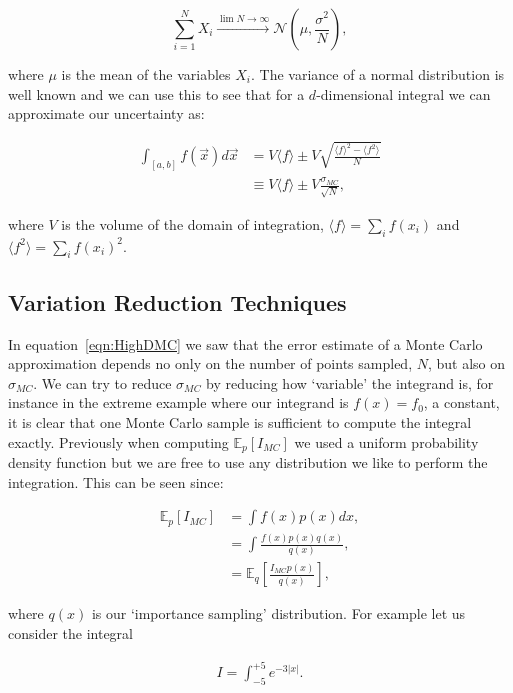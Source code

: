 	\begin{equation}
		\sum_{i=1}^{N}X_i\xrightarrow{\lim{N\rightarrow\infty}}\mathcal{N}\left(\mu, \frac{\sigma^2}{N}\right),
	\end{equation}

	where $\mu$ is the mean of the variables $X_i$.  The variance of a normal distribution is well known and we can use this to see that
	for a $d$-dimensional integral we can approximate our uncertainty as:

	\begin{align}
		\int_{[a, b]}f(\vec{x})d\vec{x} &= V\langle f\rangle \pm V\sqrt{\frac{\langle f\rangle^2 - \langle f^2\rangle}{N}}\\
		                                &\equiv V\langle f\rangle \pm V\frac{\sigma_{MC}}{\sqrt{N}},
		\label{eqn:HighDMC}
	\end{align}

	where $V$ is the volume of the domain of integration, $\langle f\rangle=\sum_i f(x_i)$ and $\langle f^2\rangle=\sum_i f(x_i)^2$.

\subsection{Variation Reduction Techniques}
\label{sub:VarReduction}

	In equation~\ref{eqn:HighDMC} we saw that the error estimate of a Monte Carlo approximation depends no only on the number of points sampled,
	$N$, but also on $\sigma_{MC}$.  We can try to reduce $\sigma_{MC}$ by reducing how `variable' the integrand is, for instance in the extreme
	example where our integrand is $f(x)=f_0$, a constant, it is clear that one Monte Carlo sample is sufficient to compute the integral exactly.
	Previously when computing $\mathbb{E}_p[I_{MC}]$ we used a uniform probability density function but we are free to use any distribution we like
	to perform the integration.  This can be seen since:

	\begin{align*}
		\mathbb{E}_p[I_{MC}] &= \int f(x)p(x)dx, \\
		                     &= \int\frac{f(x)p(x)q(x)}{q(x)}, \\
		                     &= \mathbb{E}_q\left[\frac{I_{MC}p(x)}{q(x)}\right],
	\end{align*}

	where $q(x)$ is our `importance sampling' distribution.  For example let us consider the integral

	\begin{align}
		I = \int_{-5}^{+5}e^{-3|x|}.
		\label{eqn:simpleIS}
	\end{align}

